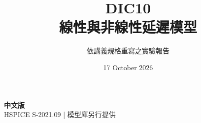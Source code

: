 \documentclass[11pt,a4paper]{article}
\title{\color{accent}DIC10\\[4pt]線性與非線性延遲模型}
\author{依講義規格重寫之實驗報告}
\date{17 October 2026}
\begin{document}
\maketitle
\begin{center}\small\textbf{中文版}\\
HSPICE S-2021.09 \quad | \quad 模型庫另行提供
\end{center}


\end{document}
